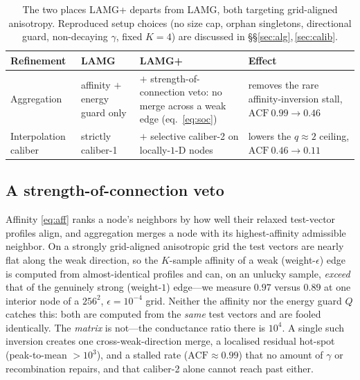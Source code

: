 \documentclass[review]{siamart220329}
\newcommand{\acf}{\mathrm{ACF}}
\begin{document}
\begin{table}[h!]\centering
\caption{The two places LAMG+ departs from LAMG, both targeting grid-aligned anisotropy. Reproduced setup choices (no size cap, orphan singletons, directional guard,
non-decaying $\gamma$, fixed $K{=}4$) are discussed in \S\S\ref{sec:alg},\,\ref{sec:calib}.}\label{tab:diff}
\begin{tabular}{>{\raggedright\arraybackslash}p{2.1cm}
                >{\raggedright\arraybackslash}p{2.4cm}
                >{\raggedright\arraybackslash}p{3.5cm}
                >{\raggedright\arraybackslash}p{3.1cm}}
\toprule
Refinement & LAMG & LAMG+ & Effect\\
\midrule
Aggregation & affinity $+$ energy guard only & $+$ strength-of-connection veto: no merge across
a weak edge (eq.~\eqref{eq:soc}) & removes the rare affinity-inversion stall,
$\acf\ 0.99\!\to\!0.46$\\
Interpolation caliber & strictly caliber-1 & $+$ selective caliber-2 on locally-$1$-D nodes &
lowers the $q\!\approx\!2$ ceiling, $\acf\ 0.46\!\to\!0.11$\\
\bottomrule
\end{tabular}
\end{table}

\subsection{A strength-of-connection veto}\label{sec:soc}
Affinity \eqref{eq:aff} ranks a node's neighbors by how well their relaxed test-vector
profiles align, and aggregation merges a node with its highest-affinity admissible neighbor.
On a strongly grid-aligned anisotropic grid the test vectors are nearly flat along the weak
direction, so the $K$-sample affinity of a weak (weight-$\epsilon$) edge is computed from
almost-identical profiles and can, on an unlucky sample, \emph{exceed} that of the genuinely
strong (weight-$1$) edge---we measure $0.97$ versus $0.89$ at one interior node of a $256^2$,
$\epsilon=10^{-4}$ grid. Neither the affinity nor the energy guard $Q$ catches this: both are
computed from the \emph{same} test vectors and are fooled identically. The \emph{matrix} is
not---the conductance ratio there is $10^4$. A single such inversion creates one
cross-weak-direction merge, a localised residual hot-spot (peak-to-mean $>10^3$), and a stalled
rate ($\acf\approx0.99$) that no amount of $\gamma$ or recombination repairs, and that
caliber-2 alone cannot reach past either.
\end{document}
